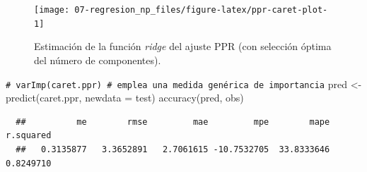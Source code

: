 \documentclass[
]{book}
\newenvironment{Shaded}{\begin{snugshade}}{\end{snugshade}}
\newcommand{\AttributeTok}[1]{\textcolor[rgb]{0.77,0.63,0.00}{#1}}
\newcommand{\CommentTok}[1]{\textcolor[rgb]{0.56,0.35,0.01}{\textit{#1}}}
\newcommand{\FunctionTok}[1]{\textcolor[rgb]{0.00,0.00,0.00}{#1}}
\newcommand{\NormalTok}[1]{#1}
\newcommand{\OtherTok}[1]{\textcolor[rgb]{0.56,0.35,0.01}{#1}}
\newcommand{\SpecialCharTok}[1]{\textcolor[rgb]{0.00,0.00,0.00}{#1}}
\theoremstyle{break}
\theoremstyle{nonumberplain}
\renewcommand{\CommentTok}[1]{\textcolor[rgb]{0.41,0.41,0.41}{\texttt{#1}}}
\begin{document}
\begin{Shaded}
\end{Shaded}

\begin{figure}[!htb]

{\centering \texttt{[image: 07-regresion\_np\_files/figure-latex/ppr-caret-plot-1]} 

}

\caption{Estimación de la función \emph{ridge} del ajuste PPR (con selección óptima del número de componentes).}\label{fig:ppr-caret-plot}
\end{figure}

\begin{Shaded}
\begin{Highlighting}[]
\CommentTok{\# varImp(caret.ppr) \# emplea una medida genérica de importancia}
\NormalTok{pred }\OtherTok{\textless{}{-}} \FunctionTok{predict}\NormalTok{(caret.ppr, }\AttributeTok{newdata =}\NormalTok{ test)}
\FunctionTok{accuracy}\NormalTok{(pred, obs)}
\end{Highlighting}
\end{Shaded}

\begin{verbatim}
  ##          me        rmse         mae         mpe        mape   r.squared 
  ##   0.3135877   3.3652891   2.7061615 -10.7532705  33.8333646   0.8249710
\end{verbatim}
\end{document}
